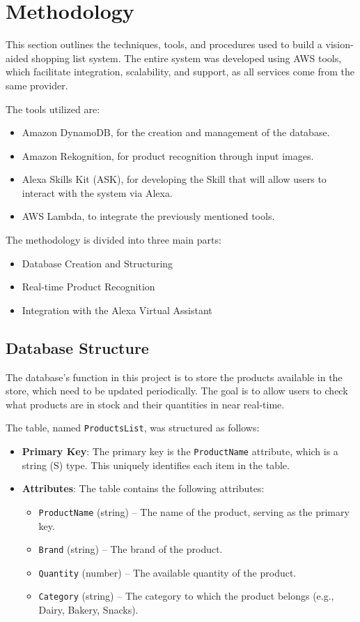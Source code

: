 \section{Methodology}

This section outlines the techniques, tools, and procedures used to build a vision-aided shopping list system. The entire system was developed using AWS tools, which facilitate integration, scalability, and support, as all services come from the same provider.

The tools utilized are: 
\begin{itemize} 
	\item Amazon DynamoDB, for the creation and management of the database. 		\item Amazon Rekognition, for product recognition through input images. 		\item Alexa Skills Kit (ASK), for developing the Skill that will allow users to interact with the system via Alexa. 
	\item AWS Lambda, to integrate the previously mentioned tools. 
\end{itemize}

The methodology is divided into three main parts: 
\begin{itemize} 
	\item Database Creation and Structuring
	\item Real-time Product Recognition 
	\item Integration with the Alexa Virtual Assistant 
\end{itemize}

\subsection{Database Structure}

The database's function in this project is to store the products available in the store, which need to be updated periodically. The goal is to allow users to check what products are in stock and their quantities in near real-time.

The table, named \texttt{ProductsList}, was structured as follows: \begin{itemize} 
	\item \textbf{Primary Key}: The primary key is the 
	\texttt{ProductName} attribute, which is a string (S) type. This uniquely identifies each item in the table. 
	\item \textbf{Attributes}: The table contains the following attributes: \begin{itemize} 
		\item \texttt{ProductName} (string) – The name of the product, serving as the primary key. 
		\item \texttt{Brand} (string) – The brand of the product. 
		\item \texttt{Quantity} (number) – The available quantity of the product. 
		\item \texttt{Category} (string) – The category to which the product belongs (e.g., Dairy, Bakery, Snacks). 
	\end{itemize} 
\end{itemize}

